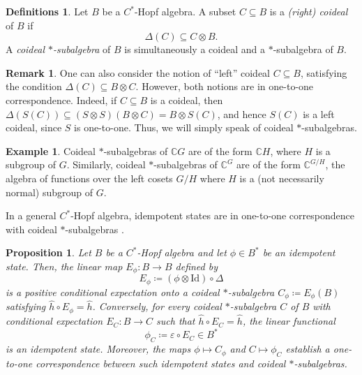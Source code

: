 \documentclass[a4paper,10pt]{amsart}
\newcommand{\newterm}[1]{\emph{#1}}
\newtheorem{proposition}[theorem]{Proposition}
\theoremstyle{definition}
\newtheorem{definitions}[theorem]{Definitions}
\newtheorem{example}[theorem]{Example}
\newtheorem{remark}[theorem]{Remark}
\begin{document}
\begin{definitions}
    \label{def:coideal}
    Let $B$ be a $C^*$-Hopf algebra. A subset $C\subseteq B$ is a \newterm{(right) coideal} of $B$ if
    \[
        \Delta(C)\subseteq C\otimes B.
    \]
    A \newterm{coideal $*$-subalgebra} of $B$ is simultaneously a coideal and a $*$-subalgebra of $B$.
\end{definitions}

\begin{remark}
One can also consider the notion of ``left'' coideal $C\subseteq B$, satisfying the condition $\Delta(C)\subseteq B\otimes C$. However, both notions are in one-to-one correspondence. Indeed, if $C\subseteq B$ is a coideal, then 
$
    \Delta(S(C)) \subseteq
    (S\otimes S)(B \otimes C) = B\otimes S(C)
$,
and hence $S(C)$ is a left coideal, since $S$ is one-to-one. Thus, we will simply speak of coideal $*$-subalgebras.
\end{remark}

\begin{example}
    Coideal $*$-subalgebras of $\mathbb{C}G$ are of the form $\mathbb{C}H$, where $H$ is a subgroup of $G$. Similarly, coideal $*$-subalgebras of $\mathbb{C}^G$ are of the form $\mathbb{C}^{G/H}$, the algebra of functions over the left cosets $G/H$ where $H$ is a (not necessarily normal) subgroup of $G$.
\end{example}

In a general $C^*$-Hopf algebra, idempotent states are in one-to-one correspondence with coideal $*$-subalgebras \cite{franz_new_2009}. 
\begin{proposition}
\label{prop:Cphi}
    Let $B$ be a $C^*$-Hopf algebra and let $\phi\in B^*$ be an idempotent state. Then, the linear map $E_\phi : B \to B$ defined by
    \begin{equation}
        E_\phi
            \coloneqq
                (\phi\otimes\mathrm{Id})\circ \Delta
    \end{equation}
    is a positive conditional expectation onto a coideal $*$-subalgebra $C_\phi \coloneqq E_\phi(B)$ sa\-tis\-fying $\hat{h} \circ E_\phi = \hat{h}$.
    Conversely, for every coideal $*$-subalgebra $C$ of $B$ with con\-di\-tio\-nal ex\-pecta\-tion $E_C : B \to C$ such that $\hat{h} \circ E_C= \hat{h}$, the linear functional
    \begin{equation}
        \phi_C
            \coloneqq
                \varepsilon\circ E_C \in B^*
    \end{equation}
    is an idempotent state. Moreover, the maps $\phi\mapsto C_\phi$ and $C\mapsto \phi_C$ establish a one-to-one correspondence between such idempotent states and coideal $*$-subalgebras.
\end{proposition}
\end{document}
